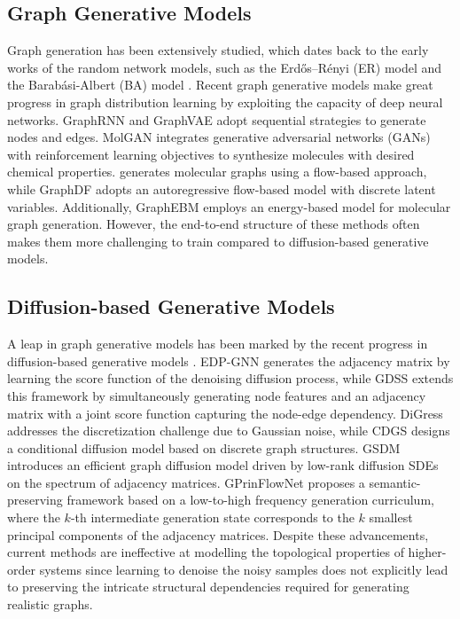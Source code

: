 

\subsection{Graph Generative Models}
Graph generation has been extensively studied, which dates back to the early works of the random network models, such as the Erdős–Rényi (ER) model \cite{ER1960} and the Barabási-Albert (BA) model \cite{BA1999}.
Recent graph generative models make great progress in graph distribution learning by exploiting the capacity of deep neural networks. 
%
GraphRNN \cite{GraphRNN2018} and GraphVAE \cite{GraphVAE-DrugDiscovery} adopt sequential strategies to generate nodes and edges.  
MolGAN \cite{GAN1-MolGAN} integrates generative adversarial networks (GANs) with reinforcement learning objectives to synthesize molecules with desired chemical properties. 
\citet{GraphAF-ICLR2020} generates molecular graphs using a flow-based approach, while GraphDF \cite{GraphDF-ICML2021} adopts an autoregressive flow-based model with discrete latent variables.
Additionally, GraphEBM \cite{GraphEBM2021} employs an energy-based model for molecular graph generation.
However, the end-to-end structure of these methods often makes them more challenging to train compared to diffusion-based generative models.

\subsection{Diffusion-based Generative Models}
A leap in graph generative models has been marked by the recent progress in diffusion-based generative models \cite{Score-SDE+ICLR2021}.
%
EDP-GNN \cite{EDPGNN-2020} generates the adjacency matrix by learning the score function of the denoising diffusion process, while GDSS \cite{GDSS+ICML2022} extends this framework by simultaneously generating node features and an adjacency matrix with a joint score function capturing the node-edge dependency.
%
DiGress \cite{DiGress+ICLR2023} addresses the discretization challenge due to Gaussian noise, while CDGS \cite{CDGS+AAAI2023} designs a conditional diffusion model based on discrete graph structures.
%
GSDM \cite{GSDM+TPAMI2023} introduces an efficient graph diffusion model driven by low-rank diffusion SDEs on the spectrum of adjacency matrices.
% 
GPrinFlowNet \cite{GPrinFlowNet+ACM2024} proposes a semantic-preserving framework based on a low-to-high frequency generation curriculum, where the $k$-th intermediate generation state corresponds to the $k$ smallest principal components of the adjacency matrices.
%
Despite these advancements, current methods are ineffective at modelling the topological properties of higher-order systems since learning to denoise the noisy samples does not explicitly lead to preserving the intricate structural dependencies required for generating realistic graphs.


